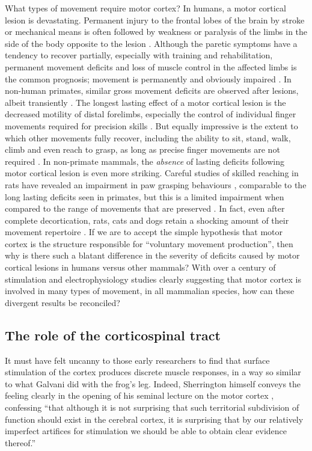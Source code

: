 What types of movement require motor cortex? In humans, a motor cortical lesion is devastating. Permanent injury to the frontal lobes of the brain by stroke or mechanical means is often followed by weakness or paralysis of the limbs in the side of the body opposite to the lesion \citep{Louis1994}. Although the paretic symptoms have a tendency to recover partially, especially with training and rehabilitation, permanent movement deficits and loss of muscle control in the affected limbs is the common prognosis; movement is permanently and obviously impaired \citep{Laplane1977,Kwakkel2003}. In non-human primates, similar gross movement deficits are observed after lesions, albeit transiently \citep{Leyton1917,Travis1955}. The longest lasting effect of a motor cortical lesion is the decreased motility of distal forelimbs, especially the control of individual finger movements required for precision skills \citep{Leyton1917,Darling2011}. But equally impressive is the extent to which other movements fully recover, including the ability to sit, stand, walk, climb and even reach to grasp, as long as precise finger movements are not required \citep{Leyton1917,Darling2011,Zaaimi2012}. In non-primate mammals, the \emph{absence} of lasting deficits following motor cortical lesion is even more striking. Careful studies of skilled reaching in rats have revealed an impairment in paw grasping behaviours \citep{Whishaw1991,Alaverdashvili2008a}, comparable to the long lasting deficits seen in primates, but this is a limited impairment when compared to the range of movements that are preserved \citep{Whishaw1991,Kawai2015}. In fact, even after complete decortication, rats, cats and dogs retain a shocking amount of their movement repertoire \citep{Goltz1888,Bjursten1976,Terry1989}. If we are to accept the simple hypothesis that motor cortex is the structure responsible for ``voluntary movement production'', then why is there such a blatant difference in the severity of deficits caused by motor cortical lesions in humans versus other mammals? With over a century of stimulation and electrophysiology studies clearly suggesting that motor cortex is involved in many types of movement, in all mammalian species, how can these divergent results be reconciled?

\subsection{The role of the corticospinal tract}

It must have felt uncanny to those early researchers to find that surface stimulation of the cortex produces discrete muscle responses, in a way so similar to what Galvani did with the frog's leg. Indeed, Sherrington himself conveys the feeling clearly in the opening of his seminal lecture on the motor cortex \cite[p.271]{Sherrington1906}, confessing ``that although it is not surprising that such territorial subdivision of function should exist in the cerebral cortex, it is surprising that by our relatively imperfect artifices for stimulation we should be able to obtain clear evidence thereof.''

